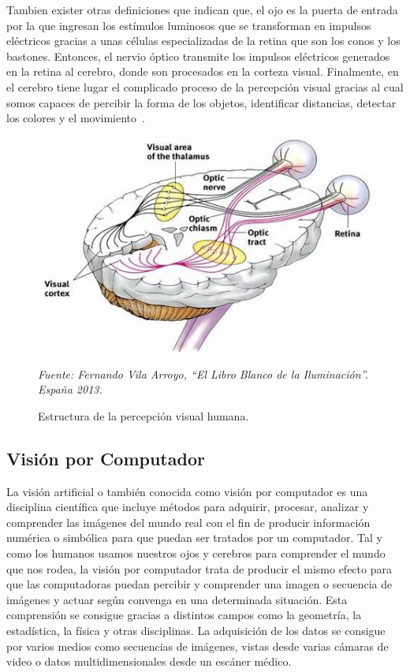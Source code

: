 Tambien exister otras definiciones que indican que, el ojo es la puerta de entrada por la que ingresan los estímulos luminosos que se transforman en impulsos eléctricos gracias a unas células especializadas de la retina que son los conos y los bastones. Entonces, el nervio óptico transmite los impulsos eléctricos generados en la retina al cerebro, donde son procesados en la corteza visual. Finalmente, en el cerebro tiene lugar el complicado proceso de la percepción visual gracias al cual somos capaces de percibir la forma de los objetos, identificar distancias, detectar los colores y el movimiento~\cite{14alonso2005personas}.


        \begin{figure}[H]
		\centering
		\includegraphics[width=120mm]{Imagenes/estructura_percepcion.jpg}
		\caption{Estructura de la percepción visual humana.}
		\vspace{0.15cm}
		\textit{Fuente: Fernando Vila Arroyo, “El Libro Blanco de la Iluminación”. España 2013.}
		\label{fig:estructura_percepcion}
		\end{figure}      	  

\subsection{Visión por Computador}
La visión artificial o también conocida como visión por computador es una disciplina científica que incluye métodos para adquirir, procesar, analizar y comprender las imágenes del mundo real con el fin de producir información numérica o simbólica para que puedan ser tratados por un computador. Tal y como los humanos usamos nuestros ojos y cerebros para comprender el mundo que nos rodea, la visión por computador trata de producir el mismo efecto para que las computadoras puedan percibir y comprender una imagen o secuencia de imágenes y actuar según convenga en una determinada situación. Esta comprensión se consigue gracias a distintos campos como la geometría, la estadística, la física y otras disciplinas. La adquisición de los datos se consigue por varios medios como secuencias de imágenes, vistas desde varias cámaras de video o datos multidimensionales desde un
escáner médico.

